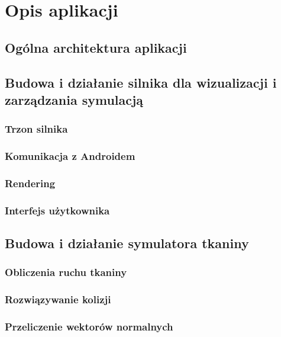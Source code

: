 \chapter{Opis aplikacji}
\label{t:praktyka}

	\section{Ogólna architektura aplikacji}
	\label{t:praktyka:ogolne}
	
	
	\section{Budowa i działanie silnika dla wizualizacji i zarządzania symulacją}
	\label{t:praktyka:silnik}
	
		\subsection{Trzon silnika}
		\label{t:praktyka:silnik:trzon}
		
		\subsection{Komunikacja z Androidem}
		\label{t:praktyka:silnik:andro}
		
		\subsection{Rendering}
		\label{t:praktyka:silnik:render}
		
		\subsection{Interfejs użytkownika}
		\label{t:praktyka:silnik:gui}
	
	
	\section{Budowa i działanie symulatora tkaniny}
	\label{t:praktyka:symulacja}
	
		\subsection{Obliczenia ruchu tkaniny}
		\label{t:praktyka:symulacja:ruch}
		
		\subsection{Rozwiązywanie kolizji}
		\label{t:praktyka:symulacja:kolizje}
		
		\subsection{Przeliczenie wektorów normalnych}
		\label{t:praktyka:symulacja:normalne}
	
	
	
